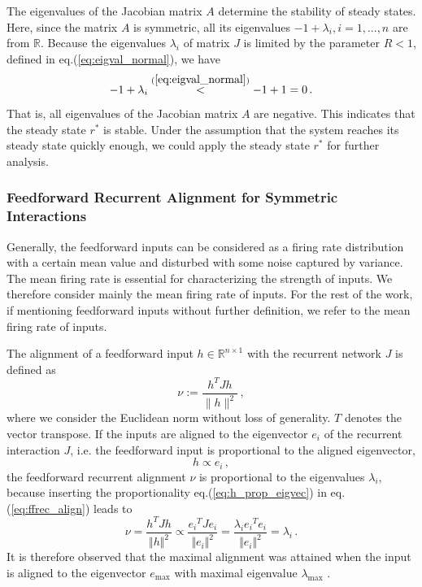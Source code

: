 \documentclass[11pt]{article}
\begin{document}
{	The eigenvalues of the Jacobian matrix $A$ determine the stability of steady states. Here, since the matrix $A$ is symmetric, all its eigenvalues $-1 + \lambda_i, i = 1, ..., n$ are from $\mathbb{R}$. Because the eigenvalues $\lambda_i$ of matrix $J$ is limited by the parameter $R<1$, defined in eq.(\ref{eq:eigval_normal}), we have 
		\begin{equation} \label{eq:sym_stable_fix_point}
			-1 + \lambda_i \overset{(\ref{eq:eigval_normal})}{<} -1 + 1 = 0 \, .
		\end{equation}
	That is, all eigenvalues of the Jacobian matrix $A$ are negative. This indicates that the steady state $r^*$ is stable. Under the assumption that the system reaches its steady state quickly enough, we could apply the steady state $r^*$ for further analysis. 
	
	\subsubsection{Feedforward Recurrent Alignment for Symmetric Interactions} \label{sec:ffrec_definition}
	Generally, the feedforward inputs can be considered as a firing rate distribution with a certain mean value and disturbed with some noise captured by variance. The mean firing rate is essential for characterizing the strength of inputs. We therefore consider mainly the mean firing rate of inputs. For the rest of the work, if mentioning feedforward inputs without further definition, we refer to the mean firing rate of inputs. 
	
	The alignment of a feedforward input $h \in \mathbb{R}^{n \times 1}$ with the recurrent network $J$ is defined as \cite{tragenap2023nature}
		\begin{equation} \label{eq:ffrec_align}
			\nu := \frac{h^T J h}{\parallel h \parallel ^2}\, ,
		\end{equation}	
	where we consider the Euclidean norm without loss of generality. $T$ denotes the vector transpose. 
	If the inputs are aligned to the eigenvector $e_i$ of the recurrent interaction $J$, i.e. the feedforward input is proportional to the aligned eigenvector, 
		\begin{equation} \label{eq:h_prop_eigvec}
			h \propto e_i  \, ,
		\end{equation}
	the feedforward recurrent alignment $\nu$ is proportional to the eigenvalues $\lambda_i$, because inserting the proportionality eq.(\ref{eq:h_prop_eigvec}) in eq.(\ref{eq:ffrec_align}) leads to
		\begin{equation} \label{eq:ffrec_equals_eigval}
			\nu = \frac{h^T J h}{\Vert h \Vert ^2} \propto \frac{{e_i}^T J e_i}{\Vert e_i \Vert^2} = \frac{\lambda_i {e_i}^T e_i}{\Vert e_i \Vert ^2} = \lambda_i \, .
		\end{equation}
	It is therefore observed that the maximal alignment was attained when the input is aligned to the eigenvector $e_{\text{max}}$ with maximal eigenvalue $\lambda_{\text{max}}$ \cite{tragenap2023nature}. 
	
}
\end{document}
